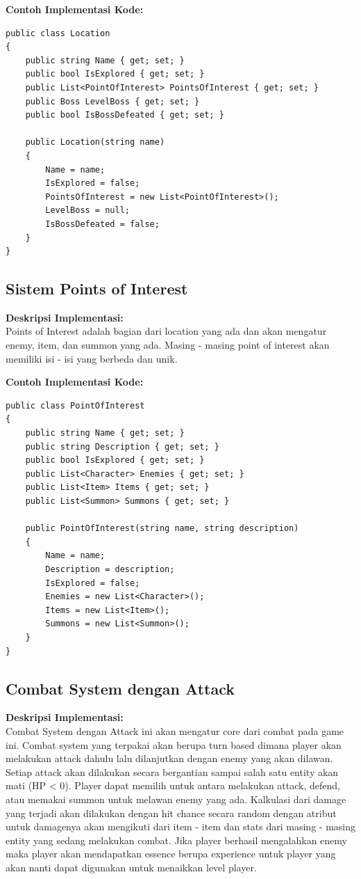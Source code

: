 \documentclass[12pt]{article}
\begin{document}
\textbf{Contoh Implementasi Kode:}
\begin{lstlisting}[language=CSharp, caption=Contoh Implementasi Sistem Location]
public class Location
{
    public string Name { get; set; }
    public bool IsExplored { get; set; }
    public List<PointOfInterest> PointsOfInterest { get; set; }
    public Boss LevelBoss { get; set; }
    public bool IsBossDefeated { get; set; }

    public Location(string name)
    {
        Name = name;
        IsExplored = false;
        PointsOfInterest = new List<PointOfInterest>();
        LevelBoss = null;
        IsBossDefeated = false;
    }
}
\end{lstlisting}

\subsection{Sistem Points of Interest}
\textbf{Deskripsi Implementasi:} \\
Points of Interest adalah bagian dari location yang ada dan akan mengatur enemy, item, dan summon yang ada. Masing - masing point of interest akan memiliki isi - isi yang berbeda dan unik. 

\textbf{Contoh Implementasi Kode:}
\begin{lstlisting}[language=CSharp, caption=Contoh Implementasi Points of Interest]
public class PointOfInterest
{
    public string Name { get; set; }
    public string Description { get; set; }
    public bool IsExplored { get; set; }
    public List<Character> Enemies { get; set; }
    public List<Item> Items { get; set; }
    public List<Summon> Summons { get; set; }

    public PointOfInterest(string name, string description)
    {
        Name = name;
        Description = description;
        IsExplored = false;
        Enemies = new List<Character>();
        Items = new List<Item>();
        Summons = new List<Summon>();
    }
}
\end{lstlisting}

\subsection{Combat System dengan Attack}
\textbf{Deskripsi Implementasi:} \\
Combat System dengan Attack ini akan mengatur core dari combat pada game ini. Combat system yang terpakai akan berupa turn based dimana player akan melakukan attack dahulu lalu dilanjutkan dengan enemy yang akan dilawan. Setiap attack akan dilakukan secara bergantian sampai salah satu entity akan mati (HP < 0). Player dapat memilih untuk antara melakukan attack, defend, atau memakai summon untuk melawan enemy yang ada. Kalkulasi dari damage yang terjadi akan dilakukan dengan hit chance secara random dengan atribut untuk damagenya akan mengikuti dari item - item dan stats dari masing - masing entity yang sedang melakukan combat. Jika player berhasil mengalahkan enemy maka player akan mendapatkan essence berupa experience untuk player yang akan nanti dapat digunakan untuk menaikkan level player.
\end{document}
